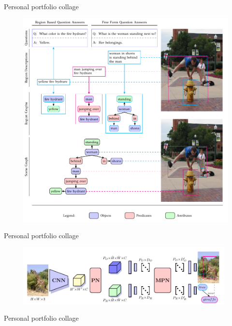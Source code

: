 \begin{frame}{Personal portfolio collage}
  \begin{figure}
    \includegraphics[height=0.9\textheight]{./img/portfolio/visual_genome_2.pdf}
  \end{figure}
\end{frame}

\begin{frame}{Personal portfolio collage}
  \begin{figure}
    \includegraphics[width=0.98\textwidth]{./img/portfolio/model_architecture.pdf}
  \end{figure}
\end{frame}

\begin{frame}{Personal portfolio collage}
  \begin{figure}
    \resizebox{!}{0.9\textheight}{%
      
    }
  \end{figure}
\end{frame}

